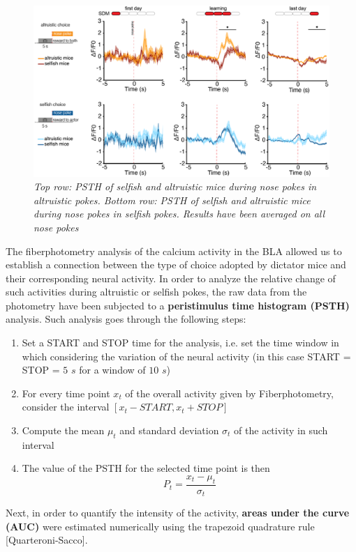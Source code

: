 \documentclass[12pt, a4paper]{report}
\begin{document}
\begin{figure}[H]
	\begin{center}
		\includegraphics[scale=0.55]{psth.png} 
	\end{center} 
	\caption{\textit{Top row: PSTH of selfish and altruistic mice during nose pokes in altruistic pokes. Bottom row:  PSTH of selfish and altruistic mice during nose pokes in selfish pokes. Results have been averaged on all nose pokes}}
	\label{psth}
\end{figure}

The fiberphotometry analysis of the calcium activity in the BLA allowed us to establish a connection between the type of choice adopted by dictator mice and their corresponding neural activity. In order to analyze the relative change of such activities during altruistic or selfish pokes, the raw data from the photometry have been subjected to a \textbf{peristimulus time histogram (PSTH)} analysis. Such analysis goes through the following steps:

\begin{enumerate}
	
	\item Set a START and STOP time for the analysis, i.e. set the time window in which considering the variation of the neural activity (in this case START = STOP = $5$ $s$ for a window of $10$ $s$)
	
	\item For every time point $x_t$ of the overall activity given by Fiberphotometry, consider the interval $[x_{t}-START , x_{t}+STOP]$
	
	\item Compute the mean $ \mu_t$ and standard deviation $\sigma_t$ of the activity in such interval
	
	\item The value of the PSTH for the selected time point is then
	$$ P_t = \frac{x_t - \mu_t}{\sigma_t}$$
\end{enumerate}
Next, in order to quantify the intensity of the activity, \textbf{areas under the curve (AUC)} were estimated numerically using the trapezoid quadrature rule [Quarteroni-Sacco].\\
\end{document}
